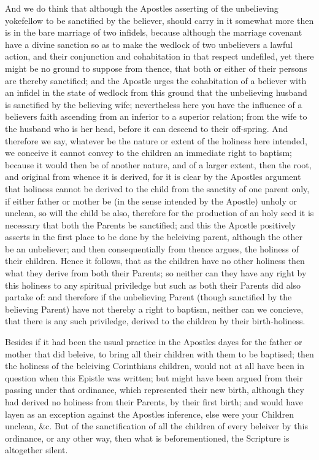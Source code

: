 \documentclass[12pt,a4paper]{book}
\begin{document}
And we do think that although the Apostles asserting of the unbelieving yokefellow to be sanctified by the believer, should carry in it somewhat more then is in the bare marriage of two infidels, because although the marriage covenant have a divine sanction so as to make the wedlock of two unbelievers a lawful action, and their conjunction and cohabitation in that respect undefiled, yet there might be no ground to suppose from thence, that both or either of their persons are thereby sanctified; and the Apostle urges the cohabitation of a believer with an infidel in the state of wedlock from this ground that the unbelieving husband is sanctified by the believing wife; nevertheless here you have the influence of a believers faith ascending from an inferior to a superior relation; from the wife to the husband who is her head, before it can descend to their off-spring. And therefore we say, whatever be the nature or extent of the holiness here intended, we conceive it cannot convey to the children an immediate right to baptism; because it would then be of another nature, and of a larger extent, then the root, and original from whence it is derived, for it is clear by the Apostles argument that holiness cannot be derived to the child from the sanctity of one parent only, if either father or mother be (in the sense intended by the Apostle) unholy or unclean, so will the child be also, therefore for the production of an holy seed it is necessary that both the Parents be sanctified; and this the Apostle positively asserts in the first place to be done by the beleiving parent, although the other be an unbeliever; and then consequentially from thence argues, the holiness of their children. Hence it follows, that as the children have no other holiness then what they derive from both their Parents; so neither can they have any right by this holiness to any spiritual priviledge but such as both their Parents did also partake of: and therefore if the unbelieving Parent (though sanctified by the believing Parent) have not thereby a right to baptism, neither can we concieve, that there is any such priviledge, derived to the children by their birth-holiness.

Besides if it had been the usual practice in the Apostles dayes for the father or mother that did beleive, to bring all their children with them to be baptised; then the holiness of the beleiving Corinthians children, would not at all have been in question when this Epistle was written; but might have been argued from their passing under that ordinance, which represented their new birth, although they had derived no holiness from their Parents, by their first birth; and would have layen as an exception against the Apostles inference, else were your Children unclean, \&c. But of the sanctification of all the children of every beleiver by this ordinance, or any other way, then what is beforementioned, the Scripture is altogether silent.
\end{document}
